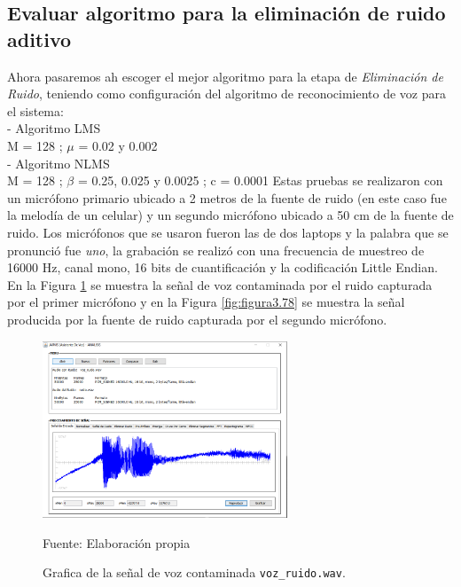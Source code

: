 \subsection{Evaluar algoritmo para la eliminación de ruido aditivo}
Ahora pasaremos ah escoger el mejor algoritmo para la etapa de \textit{Eliminación de Ruido}, teniendo como configuración del algoritmo de reconocimiento de voz para el sistema: \\
- Algoritmo LMS\\
\hspace*{1cm} M = 128 ; \qquad $\mu$ = 0.02 y 0.002\\
- Algoritmo NLMS \\
\hspace*{1cm} M = 128 ; \qquad $\beta$ = 0.25, 0.025 y 0.0025 ; \qquad c = 0.0001
\vskip 0.5cm
Estas pruebas se realizaron con un micrófono primario ubicado a 2 metros de la fuente de ruido (en este caso fue la melodía de un celular) y un segundo micrófono ubicado a 50 cm de la fuente de ruido. Los micrófonos que se usaron fueron las de dos laptops y la palabra que se pronunció fue \textit{uno}, la grabación se realizó con una frecuencia de muestreo de 16000 Hz, canal mono, 16 bits de cuantificación y la codificación Little Endian.
\vskip 0.5cm
En la Figura \ref{fig:figura3.77} se muestra la señal de voz contaminada por el ruido capturada por el primer micrófono y en la Figura \ref{fig:figura3.78} se muestra la señal producida por la fuente de ruido capturada por el segundo micrófono.

\begin{figure}[H]
\begin{center}
\includegraphics[width=0.65\textwidth]{Imagenes/Cap3/image077}
\end{center}
\begin{center}
\vskip -0.5cm
\caption{\small{Grafica de la señal de voz contaminada \texttt{voz\_ruido.wav}.}}
\label{fig:figura3.77}
{\small{Fuente: Elaboración propia}}
\end{center}
\end{figure}


